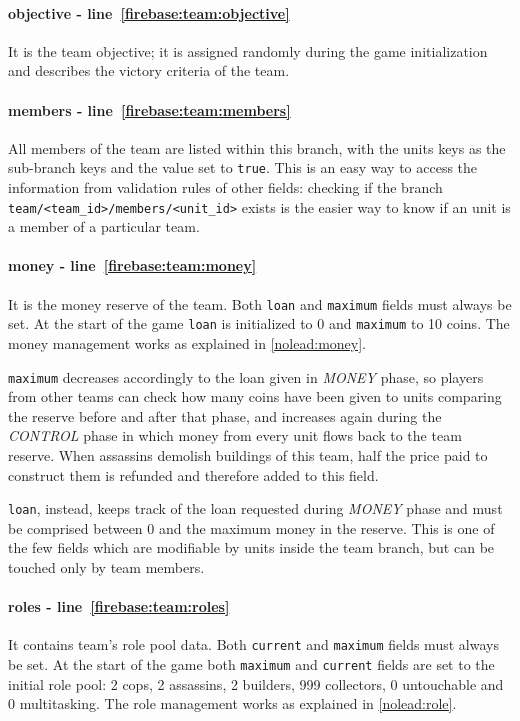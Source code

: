 				\paragraph{objective - line~\ref{firebase:team:objective}}
				It is the team objective; it is assigned randomly during the game initialization and describes the victory criteria of the team.
			
				\paragraph{members - line~\ref{firebase:team:members}}
				All members of the team are listed within this branch, with the units keys as the sub-branch keys and the value set to \lstinline|true|. This is an easy way to access the information from validation rules of other fields: checking if the branch \lstinline|team/<team_id>/members/<unit_id>| exists is the easier way to know if an unit is a member of a particular team.
			
				\paragraph{money - line~\ref{firebase:team:money}}
				It is the money reserve of the team. Both \lstinline|loan| and \lstinline|maximum| fields must always be set. At the start of the game \lstinline|loan| is initialized to 0 and \lstinline|maximum| to 10 coins.
				The money management works as explained in \autoref{nolead:money}.
				
				\lstinline|maximum| decreases accordingly to the loan given in \emph{MONEY} phase, so players from other teams can check how many coins have been given to units comparing the reserve before and after that phase, and increases again during the \emph{CONTROL} phase in which money from every unit flows back to the team reserve.
				When assassins demolish buildings of this team, half the price paid to construct them is refunded and therefore added to this field.
				
				\lstinline|loan|, instead, keeps track of the loan requested during \emph{MONEY} phase and must be comprised between 0 and the maximum money in the reserve. This is one of the few fields which are modifiable by units inside the team branch, but can be touched only by team members.
				
				\paragraph{roles - line~\ref{firebase:team:roles}}
				It contains team's role pool data. Both \lstinline|current| and \lstinline|maximum| fields must always be set. At the start of the game both \lstinline|maximum| and \lstinline|current| fields are set to the initial role pool: 2 cops, 2 assassins, 2 builders, 999 collectors, 0 untouchable and 0 multitasking.
				The role management works as explained in \autoref{nolead:role}.
				
